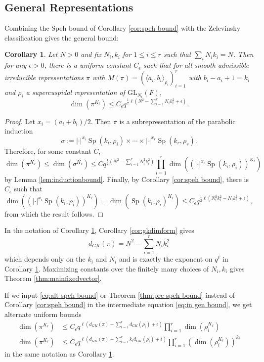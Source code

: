 \documentclass{amsart}
\newcommand{\lf}{\left}
\newcommand{\ri}{\right}
\newcommand{\f}{\frac}
\newcommand{\GL}{\mathrm{GL}}
\newcommand{\eps}{\epsilon}
\newcommand{\1}{\m 1}
\DeclareMathOperator{\Speh}{\mathrm{Sp}}
\newtheorem{cor}[thm]{Corollary}
\theoremstyle{remark}
\theoremstyle{definition}
\numberwithin{equation}{subsection}
\begin{document}
\subsection{General Representations}\label{ssec:fixedvectorbound}
Combining the Speh bound of Corollary \ref{cor:speh bound} with the Zelevinsky classification gives the general bound:

\begin{cor}\label{cor:bodyfixedvector}
Let $N > 0$ and fix $N_i, k_i$ for $1 \leq i \leq r$ such that $\sum_i N_i k_i = N$. Then for any $\eps > 0$, there is a uniform constant $C_\eps$ such that for all smooth admissible irreducible representations $\pi$ with $M(\pi) = (\langle a_i, b_i \rangle_{ \rho_i})_{i=1}^r$ with $b_i - a_i + 1 = k_i$ and $\rho_i$ a supercuspidal representation of $\GL_{N_i}(F)$, 
\[
\dim(\pi^{K_\ell}) \leq C_\eps q^{\f12  \ell (N^2 - \sum_{i=1}^r N_i k_i^2 + \eps) }.
\]
\end{cor}

\begin{proof}
Let $x_i = (a_i + b_i)/2$. Then $\pi$ is a subrepresentation of the parabolic induction
\[
\sigma := |\cdot|^{x_i} \Speh(k_i, \rho_i) \times \cdots \times |\cdot|^{x_r} \Speh(k_r, \rho_r).
\]
Therefore, for some constant $C$,
\[
\dim(\pi^{K_\ell}) \leq \dim(\sigma^{K_\ell}) \leq Cq^{\f12 (N^2 - \sum_{i=1}^r N_i^2 k_i^2)} \prod_{i=1}^r \dim((|\cdot|^{x_i} \Speh(k_i, \rho_i))^{K_\ell}) 
\]
by Lemma \ref{lem:inductionbound}. Finally, by Corollary \ref{cor:speh bound}, there is $C_\eps$ such that
\begin{equation}\label{eq:in gen bound}
\dim((|\cdot|^{x_i} \Speh(k_i, \rho_i))^{K_\ell}) = \dim(\Speh(k_i, \rho_i)^{K_\ell}) \leq C_\eps q^{ \f12 \ell(N_i^2 k_i^2 - N_i k_i^2 + \eps)},
\end{equation}
from which the result follows. 
\end{proof}

In the notation of Corollary \ref{cor:bodyfixedvector}, Corollary \ref{cor:gkdimform} gives
\[
d_{GK}(\pi) = N^2 - \sum_{i=1}^r N_i k_i^2
\]
which depends only on the $k_i$ and $N_i$ and is exactly the exponent on $q^\ell$ in Corollary \ref{cor:bodyfixedvector}. Maximizing constants over the finitely many choices of $N_i, k_i$ gives Theorem \ref{thm:mainfixedvector}. 

If we input \eqref{eq:alt speh bound} or Theorem \ref{thm:pre speh bound} instead of Corollary \ref{cor:speh bound} in the intermediate equation \eqref{eq:in gen bound}, we get alternate uniform bounds
\begin{align}\label{eq:alt gen bound}
\dim(\pi^{K_\ell}) &\leq C_\eps q^{\ell \lf(d_{GK}(\pi) - \sum_{i=1}^r d_{GK}(\rho_i) + \eps \ri)} \prod_{i=1}^r \dim(\rho_i^{K_\ell}) \\
\dim(\pi^{K_\ell}) &\leq C_\eps q^{\ell \lf(d_{GK}(\pi) - \sum_{i=1}^r k_i d_{GK}(\rho_i) + \eps \ri)} \prod_{i=1}^r \lf(\dim(\rho_i^{K_\ell})\ri)^{k_i} \label{eq:alt gen bound 2}
\end{align}
in the same notation as Corollary \ref{cor:bodyfixedvector}. 
\end{document}
